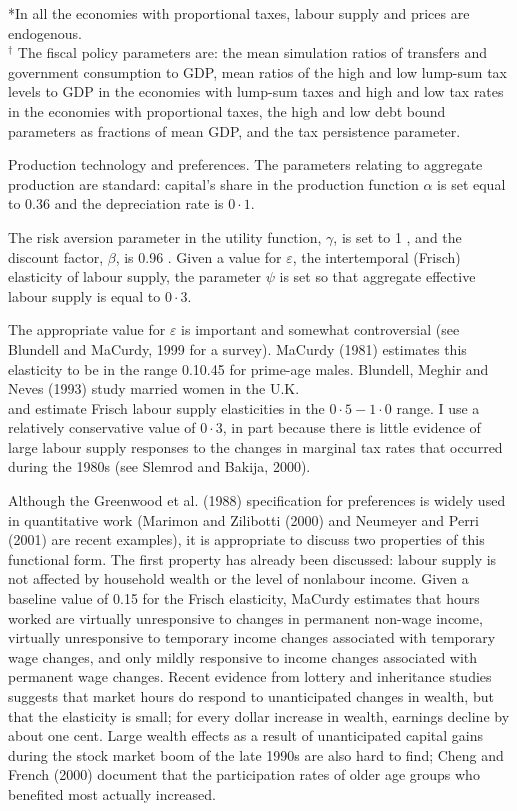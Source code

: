 \documentclass[11pt]{article}
\begin{document}
*In all the economies with proportional taxes, labour supply and prices are endogenous.\\
${ }^{\dagger}$ The fiscal policy parameters are: the mean simulation ratios of transfers and government consumption to GDP, mean ratios of the high and low lump-sum tax levels to GDP in the economies with lump-sum taxes and high and low tax rates in the economies with proportional taxes, the high and low debt bound parameters as fractions of mean GDP, and the tax persistence parameter.

Production technology and preferences. The parameters relating to aggregate production are standard: capital's share in the production function $\alpha$ is set equal to 0.36 and the depreciation rate is $0 \cdot 1$.

The risk aversion parameter in the utility function, $\gamma$, is set to 1 , and the discount factor, $\beta$, is 0.96 . Given a value for $\varepsilon$, the intertemporal (Frisch) elasticity of labour supply, the parameter $\psi$ is set so that aggregate effective labour supply is equal to $0 \cdot 3$.

The appropriate value for $\varepsilon$ is important and somewhat controversial (see Blundell and MaCurdy, 1999 for a survey). MaCurdy (1981) estimates this elasticity to be in the range 0.10.45 for prime-age males. Blundell, Meghir and Neves (1993) study married women in the U.K.\\
and estimate Frisch labour supply elasticities in the $0 \cdot 5-1 \cdot 0$ range. I use a relatively conservative value of $0 \cdot 3$, in part because there is little evidence of large labour supply responses to the changes in marginal tax rates that occurred during the 1980s (see Slemrod and Bakija, 2000).

Although the Greenwood et al. (1988) specification for preferences is widely used in quantitative work (Marimon and Zilibotti (2000) and Neumeyer and Perri (2001) are recent examples), it is appropriate to discuss two properties of this functional form. The first property has already been discussed: labour supply is not affected by household wealth or the level of nonlabour income. Given a baseline value of 0.15 for the Frisch elasticity, MaCurdy estimates that hours worked are virtually unresponsive to changes in permanent non-wage income, virtually unresponsive to temporary income changes associated with temporary wage changes, and only mildly responsive to income changes associated with permanent wage changes. Recent evidence from lottery and inheritance studies suggests that market hours do respond to unanticipated changes in wealth, but that the elasticity is small; for every dollar increase in wealth, earnings decline by about one cent. Large wealth effects as a result of unanticipated capital gains during the stock market boom of the late 1990s are also hard to find; Cheng and French (2000) document that the participation rates of older age groups who benefited most actually increased.
\end{document}
